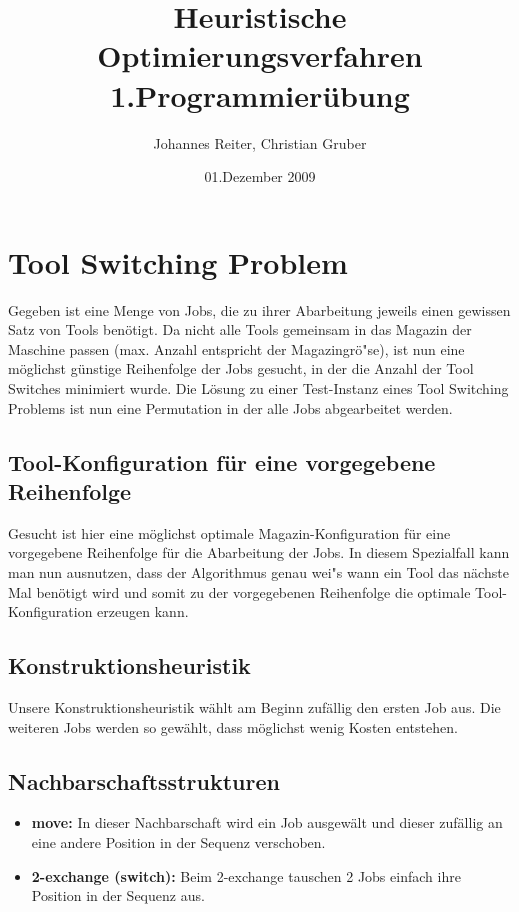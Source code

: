 \documentclass[a4paper,10pt]{article}
\title{Heuristische Optimierungsverfahren \\ \bigskip \textbf{1.Programmier\"{u}bung}}
\author{Johannes Reiter, Christian Gruber}
\date{01.Dezember 2009}
\begin{document}
\maketitle

\section{Tool Switching Problem}
Gegeben ist eine Menge von Jobs, die zu ihrer Abarbeitung jeweils einen gewissen Satz von Tools ben\"{o}tigt.
Da nicht alle Tools gemeinsam in das Magazin der Maschine passen (max. Anzahl entspricht der Magazingr\"{o}"se), ist
nun eine m\"{o}glichst g\"{u}nstige Reihenfolge der Jobs gesucht, in der die Anzahl der Tool Switches minimiert wurde.
Die L\"{o}sung zu einer Test-Instanz eines Tool Switching Problems ist nun eine Permutation in der alle Jobs abgearbeitet
werden.

\subsection{Tool-Konfiguration f\"{u}r eine vorgegebene Reihenfolge}
Gesucht ist hier eine m\"{o}glichst optimale Magazin-Konfiguration f\"{u}r eine vorgegebene Reihenfolge f\"{u}r die Abarbeitung der Jobs. In diesem Spezialfall kann man nun ausnutzen, dass der Algorithmus genau wei"s wann ein Tool das n\"{a}chste Mal ben\"{o}tigt wird und somit zu der vorgegebenen Reihenfolge die optimale Tool-Konfiguration erzeugen kann.

\subsection{Konstruktionsheuristik}
Unsere Konstruktionsheuristik w\"{a}hlt am Beginn zuf\"{a}llig den ersten Job aus. Die weiteren Jobs werden so gew\"{a}hlt, dass m\"{o}glichst wenig Kosten entstehen.

\subsection{Nachbarschaftsstrukturen}
\begin{itemize}
	\item \textbf{move:} In dieser Nachbarschaft wird ein Job ausgew\"{a}lt und dieser zuf\"{a}llig an eine andere Position in der Sequenz verschoben. 
	\item \textbf{2-exchange (switch):} Beim 2-exchange tauschen 2 Jobs einfach ihre Position in der Sequenz aus.
\end{itemize}
\end{document}
